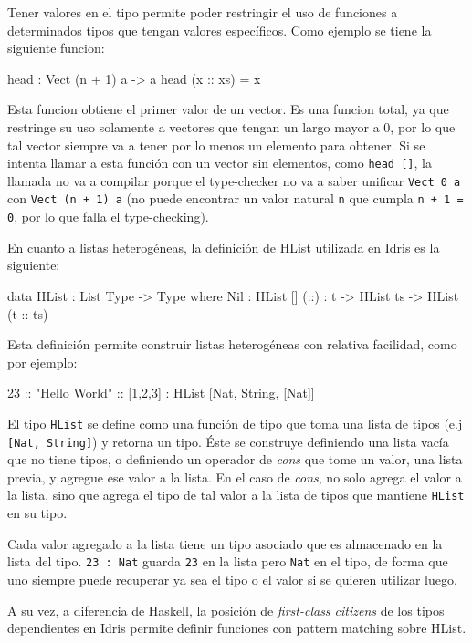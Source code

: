 Tener valores en el tipo permite poder restringir el uso de funciones a determinados tipos que tengan valores específicos. Como ejemplo se tiene la siguiente funcion:

\begin{code}
head : Vect (n + 1) a -> a
head (x :: xs) = x
\end{code}

Esta funcion obtiene el primer valor de un vector. Es una funcion total, ya que restringe su uso solamente a vectores que tengan un largo mayor a 0, por lo que tal vector siempre va a tener por lo menos un elemento para obtener. Si se intenta llamar a esta función con un vector sin elementos, como \texttt{head []}, la llamada no va a compilar porque el type-checker no va a saber unificar \texttt{Vect 0 a} con \texttt{Vect (n + 1) a} (no puede encontrar un valor natural \texttt{n} que cumpla \texttt{n + 1 = 0}, por lo que falla el type-checking).

En cuanto a listas heterogéneas, la definición de HList utilizada en Idris es la siguiente:

\begin{code}
data HList : List Type -> Type where
  Nil : HList []
  (::) : t -> HList ts -> HList (t :: ts)
\end{code}

Esta definición permite construir listas heterogéneas con relativa facilidad, como por ejemplo:

\begin{code}
23 :: "Hello World" :: [1,2,3] :
    HList [Nat, String, [Nat]]
\end{code}

El tipo \texttt{HList} se define como una función de tipo que toma una lista de tipos (e.j \texttt{[Nat, String]}) y retorna un tipo. Éste se construye definiendo una lista vacía que no tiene tipos, o definiendo un operador de \textit{cons} que tome un valor, una lista previa, y agregue ese valor a la lista. En el caso de \textit{cons}, no solo agrega el valor a la lista, sino que agrega el tipo de tal valor a la lista de tipos que mantiene \texttt{HList} en su tipo.

Cada valor agregado a la lista tiene un tipo asociado que es almacenado en la lista del tipo. \texttt{23 : Nat} guarda \texttt{23} en la lista pero \texttt{Nat} en el tipo, de forma que uno siempre puede recuperar ya sea el tipo o el valor si se quieren utilizar luego.

A su vez, a diferencia de Haskell, la posición de \textit{first-class citizens} de los tipos dependientes en Idris permite definir funciones con pattern matching sobre HList.


